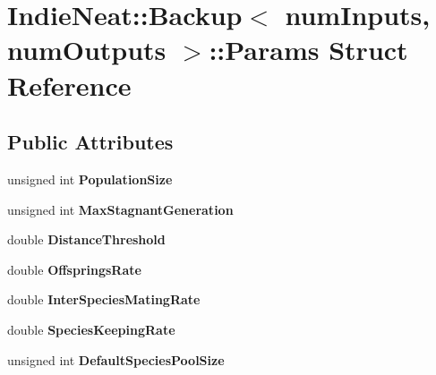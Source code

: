 \hypertarget{struct_indie_neat_1_1_backup_1_1_params}{}\section{Indie\+Neat\+:\+:Backup$<$ num\+Inputs, num\+Outputs $>$\+:\+:Params Struct Reference}
\label{struct_indie_neat_1_1_backup_1_1_params}
\subsection*{Public Attributes}
\begin{DoxyCompactItemize}
\item 
\mbox{\label{struct_indie_neat_1_1_backup_1_1_params_acbbb31260ac7ee6aa67c7b4ea5ece152}} 
unsigned int {\bfseries Population\+Size}
\item 
\mbox{\label{struct_indie_neat_1_1_backup_1_1_params_a58878b4923e2812f1679f1ad1fa3b6b6}} 
unsigned int {\bfseries Max\+Stagnant\+Generation}
\item 
\mbox{\label{struct_indie_neat_1_1_backup_1_1_params_a87cbf2c1e1bdd474f6198893b9513493}} 
double {\bfseries Distance\+Threshold}
\item 
\mbox{\label{struct_indie_neat_1_1_backup_1_1_params_a43b2e1fed098168ba66e9e495b20c8a4}} 
double {\bfseries Offsprings\+Rate}
\item 
\mbox{\label{struct_indie_neat_1_1_backup_1_1_params_a6f31baa5e334ad02bc9f715a4b2571b3}} 
double {\bfseries Inter\+Species\+Mating\+Rate}
\item 
\mbox{\label{struct_indie_neat_1_1_backup_1_1_params_ad2b4ade3e850705f933290403412529a}} 
double {\bfseries Species\+Keeping\+Rate}
\item 
\mbox{\label{struct_indie_neat_1_1_backup_1_1_params_a7a4f488dba9eee908013d641f0a51ee8}} 
unsigned int {\bfseries Default\+Species\+Pool\+Size}

\end{DoxyCompactItemize}
